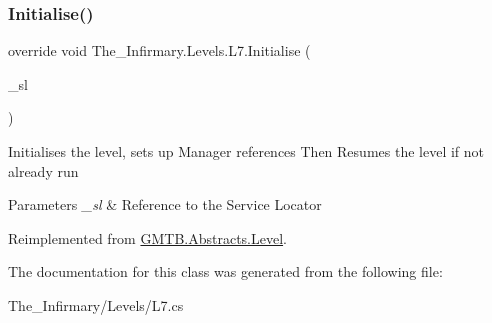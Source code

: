 \subsubsection{\texorpdfstring{Initialise()}{Initialise()}}
{\footnotesize\ttfamily override void The\+\_\+\+Infirmary.\+Levels.\+L7.\+Initialise (\begin{DoxyParamCaption}\item[{\mbox{\hyperlink{interface_g_m_t_b_1_1_interfaces_1_1_i_service_locator}{I\+Service\+Locator}}}]{\+\_\+sl }\end{DoxyParamCaption})\hspace{0.3cm}{\ttfamily [virtual]}}



Initialises the level, sets up Manager references Then Resumes the level if not already run 


\begin{DoxyParams}{Parameters}
{\em \+\_\+sl} & Reference to the Service Locator \\
\hline
\end{DoxyParams}


Reimplemented from \mbox{\hyperlink{class_g_m_t_b_1_1_abstracts_1_1_level_a0048401bb0fb66b0fb0c19b3b25e4265}{G\+M\+T\+B.\+Abstracts.\+Level}}.



The documentation for this class was generated from the following file\+:\begin{DoxyCompactItemize}
\item 
The\+\_\+\+Infirmary/\+Levels/L7.\+cs\end{DoxyCompactItemize}
